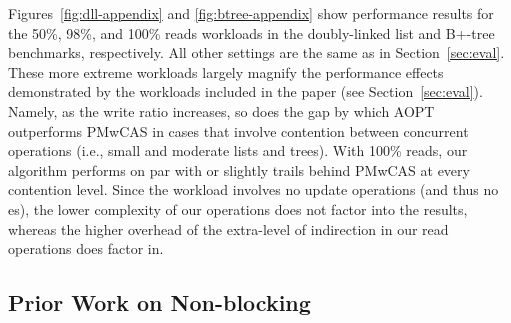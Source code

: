 Figures~\ref{fig:dll-appendix} and \ref{fig:btree-appendix} show performance results for the 50\%, 98\%, and 100\% reads workloads in the doubly-linked list and B+-tree benchmarks, respectively. All other settings are the same as in Section~\ref{sec:eval}.
These more extreme workloads largely magnify the performance effects demonstrated by the workloads included in the paper (see Section~\ref{sec:eval}). Namely, as the write ratio increases, so does the gap by which AOPT outperforms PMwCAS in cases that involve contention between concurrent \mcas{} operations (i.e., small and moderate lists and trees). With 100\% reads, our algorithm performs on par with or slightly trails behind PMwCAS at every contention level. Since the workload involves no update operations (and thus no \mcas{}es), the lower complexity of our \mcas{} operations does not factor into the results, whereas the higher overhead of the extra-level of indirection in our read operations does factor in. %



\subsection{Prior Work on Non-blocking \mcas{}}
\label{sec:related-non-blocking-mcas}

